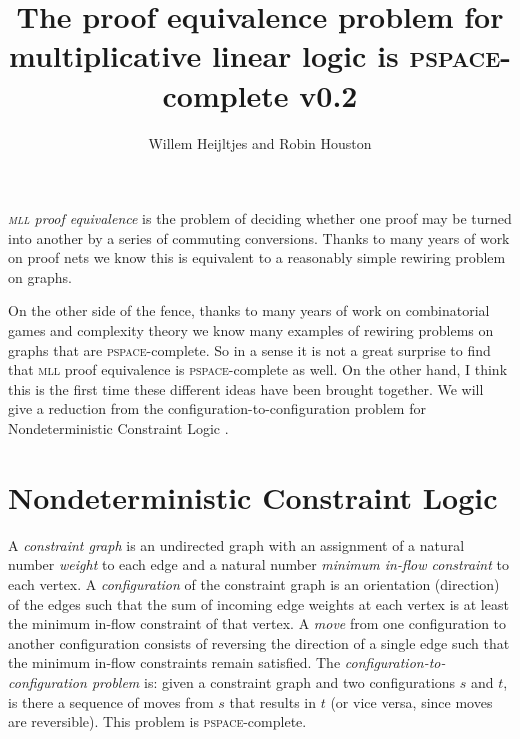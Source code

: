 \documentclass{robinminion}
\author{Willem Heijltjes and Robin Houston}
\title{The proof equivalence problem for multiplicative linear logic is \textsc{pspace}-complete v0.2}
\begin{document}
\maketitle

\linespread{1.1}\selectfont
\noindent\emph{\textsc{mll} proof equivalence} is the problem of deciding whether one proof may be turned into another by a series of commuting conversions. Thanks to many years of work on proof nets \citep{Girard87, DR89, TrimbleThesis, BCST, HughesFreeStar} we know this is equivalent to a reasonably simple rewiring problem on graphs.

On the other side of the fence, thanks to many years of work on combinatorial games and complexity theory \citep{RushHour, HearnDemaineTCS, GamesPuzzlesAndComputation, TheConnectivityOfBooleanSatisfiability, ReconfigurationProblems} we know many examples of rewiring problems on graphs that are \textsc{pspace}-complete. So in a sense it is not a great surprise to find that \textsc{mll} proof equivalence is \textsc{pspace}-complete as well. On the other hand, I think this is the first time these different ideas have been brought together. We will give a reduction from the configuration-to-configuration problem for Nondeterministic Constraint Logic \citep{HearnDemaineTCS, GamesPuzzlesAndComputation}.


\section*{Nondeterministic Constraint Logic}

A \emph{constraint graph} is an undirected graph with an assignment of a natural number \emph{weight} to each edge and a natural number \emph{minimum in-flow constraint} to each vertex. A \emph{configuration} of the constraint graph is an orientation (direction) of the edges such that the sum of incoming edge weights at each vertex is at least the minimum in-flow constraint of that vertex. A \emph{move} from one configuration to another configuration consists of reversing the direction of a single edge such that the minimum in-flow constraints remain satisfied. The \emph{configuration-to-configuration problem} is: given a constraint graph and two configurations $s$ and $t$, is there a sequence of moves from $s$ that results in $t$ (or vice versa, since moves are reversible). This problem is \textsc{pspace}-complete. \citep{HearnDemaineTCS, GamesPuzzlesAndComputation}
\end{document}
